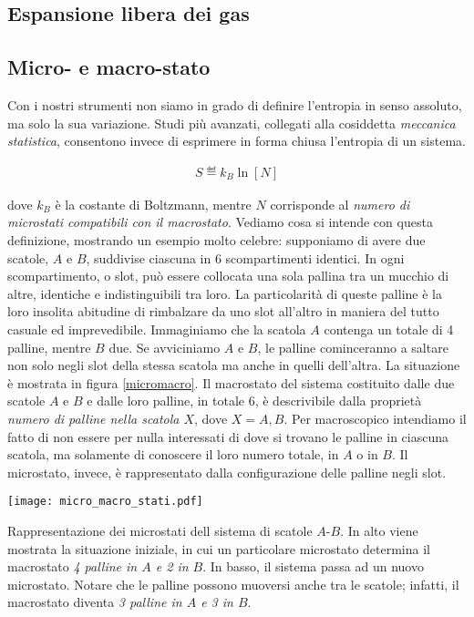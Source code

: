 \subsection{Espansione libera dei gas}



\subsection{Micro- e macro-stato}
Con i nostri strumenti non siamo in grado di definire l'entropia in
senso assoluto, ma solo la sua variazione. Studi più avanzati,
collegati alla cosiddetta \textit{meccanica statistica}, consentono
invece di esprimere in forma chiusa l'entropia di un sistema.

\begin{align}
    S \eqdef k_B \ln [N]\label{entropia_meccanica_statistica}
\end{align}

\noindent dove $k_B$ è la costante di Boltzmann, mentre $N$
corrisponde al \textit{numero di microstati compatibili con il
macrostato}. Vediamo cosa si intende con questa definizione,
mostrando un esempio molto celebre: supponiamo di avere due
scatole, $A$ e $B$, suddivise ciascuna in 6 scompartimenti
identici. In ogni scompartimento, o slot, può essere collocata
una sola pallina tra un mucchio di altre, identiche e indistinguibili
tra loro. La particolarità
di queste palline è la loro insolita abitudine di rimbalzare
da uno slot all'altro in maniera del tutto casuale ed imprevedibile.
Immaginiamo che la scatola $A$ contenga
un totale di 4 palline, mentre $B$ due. Se avviciniamo $A$ e
$B$, le palline cominceranno a saltare non solo negli slot
della stessa scatola ma anche in quelli dell'altra. La situazione è
mostrata in figura \ref{micromacro}. Il macrostato del sistema
costituito dalle due scatole $A$ e $B$ e dalle loro palline,
in totale 6, è descrivibile dalla proprietà \textit{numero di palline nella scatola $X$},
dove $X = A, B$. Per macroscopico intendiamo
il fatto di non essere per nulla interessati di dove si trovano
le palline in ciascuna scatola, ma solamente di conoscere il
loro numero totale, in $A$ o in $B$. Il microstato, invece,
è rappresentato dalla configurazione delle palline negli slot.

\begin{marginfigure}
    \centering
    \texttt{[image: micro\_macro\_stati.pdf]}
    \caption{Rappresentazione dei microstati dell sistema di scatole
    $A$-$B$. In alto viene mostrata la situazione iniziale, in cui
    un particolare microstato determina il macrostato \textit{4 palline
    in $A$ e 2 in $B$}. In basso, il sistema passa ad un nuovo microstato.
    Notare che le palline possono muoversi anche tra le scatole; infatti,
    il macrostato diventa \textit{3 palline in $A$ e 3 in $B$}.}
    \label{micromacro}
\end{marginfigure}

